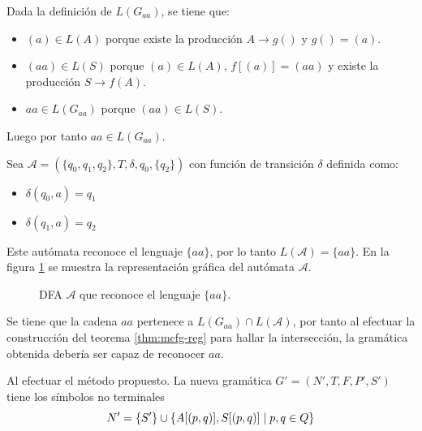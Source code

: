 Dada la definición de $L(G_{aa})$, se tiene que:
\begin{itemize}
    \item $(a) \in L(A)$ porque existe la producción $A \to g()$ y $g() = (a)$.
    \item $(aa) \in L(S)$ porque $(a) \in L(A)$, $f[(a)] = (aa)$ y existe la producción $S \to f(A)$.
    \item $aa \in L(G_{aa})$ porque $(aa) \in L(S)$.
\end{itemize}

Luego por tanto $aa \in L(G_{aa})$.

Sea $\mathcal{A} = (\{q_0, q_1, q_2\}, T, \delta, q_0, \{q_2\})$ con función de transición $\delta$ definida como:
\begin{itemize}
    \item $\delta(q_0, a) = q_1$
    \item $\delta(q_1, a) = q_2$
\end{itemize}

Este autómata reconoce el lenguaje $\{aa\}$, por lo tanto $L(\mathcal{A}) = \{aa\}$. En la figura \ref{fig:dfa-example-2} se muestra la representación gráfica del autómata $\mathcal{A}$.

\begin{figure}[t]
    \centering
    \begin{otherlanguage}{english}
    \end{otherlanguage}
    \caption{DFA $\mathcal{A}$ que reconoce el lenguaje $\{aa\}$.}
    \label{fig:dfa-example-2}
\end{figure}

Se tiene que la cadena $aa$ pertenece a $L(G_{aa}) \cap L(\mathcal{A})$, por tanto al efectuar la construcción del teorema \ref{thm:mcfg-reg} para hallar la intersección, la gramática obtenida debería ser capaz de reconocer $aa$.

Al efectuar el método propuesto. La nueva gramática $G' = (N', T, F, P', S')$ tiene los símbolos no terminales
$$
    N' = \{S'\} \cup \{A[(p, q)], S[(p, q)] \;|\; p, q \in Q\}
$$

